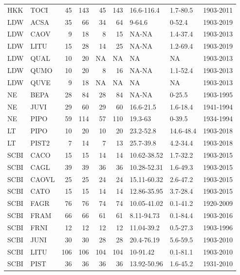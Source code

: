 \documentclass[
]{article}
\begin{document}
\begin{table}[!h]
{\begin{tabular}{llrrrrlll}
\addlinespace
HKK & TOCI & 45 & 143 & 45 & 143 & 16.6-116.4 & 1.7-80.5 & 1903-2011\\
\addlinespace
LDW & ACSA & 35 & 66 & 34 & 64 & 9-64.6 & 0-52.4 & 1903-2019\\
\addlinespace
LDW & CAOV & 9 & 18 & 8 & 15 & NA-NA & 1.4-37.4 & 1903-2013\\
\addlinespace
LDW & LITU & 15 & 28 & 14 & 25 & NA-NA & 1.2-69.4 & 1903-2019\\
\addlinespace
LDW & QUAL & 10 & 20 & NA & NA & NA & NA & 1903-2013\\
\addlinespace
LDW & QUMO & 10 & 20 & 8 & 16 & NA-NA & 1.1-52.4 & 1903-2013\\
\addlinespace
LDW & QUVE & 9 & 18 & NA & NA & NA & NA & 1903-2013\\
\addlinespace
NE & BEPA & 28 & 84 & 28 & 84 & NA-NA & 0-25.5 & 1903-1995\\
\addlinespace
NE & JUVI & 29 & 60 & 29 & 60 & 16.6-21.5 & 1.6-18.4 & 1941-1994\\
\addlinespace
NE & PIPO & 59 & 114 & 57 & 110 & 19.3-63 & 0-39.5 & 1934-1994\\
\addlinespace
LT & PIPO & 10 & 20 & 10 & 20 & 23.2-52.8 & 14.6-48.4 & 1903-2018\\
\addlinespace
LT & PIST2 & 7 & 14 & 7 & 13 & 25.7-39.8 & 4.2-34.4 & 1903-2018\\
\addlinespace
SCBI & CACO & 15 & 15 & 14 & 14 & 10.62-38.52 & 1.7-32.2 & 1903-2015\\
\addlinespace
SCBI & CAGL & 39 & 39 & 36 & 36 & 10.28-52.31 & 1.6-49.3 & 1903-2015\\
\addlinespace
SCBI & CAOVL & 25 & 25 & 24 & 24 & 15.11-60.32 & 2.6-47.2 & 1903-2015\\
\addlinespace
SCBI & CATO & 15 & 15 & 14 & 14 & 12.86-35.95 & 3.7-28.4 & 1903-2015\\
\addlinespace
SCBI & FAGR & 76 & 76 & 74 & 74 & 10.05-41.02 & 0.1-41.2 & 1920-2009\\
\addlinespace
SCBI & FRAM & 66 & 66 & 61 & 61 & 8.11-94.73 & 0.1-84.4 & 1903-2016\\
\addlinespace
SCBI & FRNI & 12 & 12 & 12 & 12 & 11.04-39.2 & 0.5-27.3 & 1903-1996\\
\addlinespace
SCBI & JUNI & 30 & 30 & 28 & 28 & 20.4-76.19 & 5.6-59.5 & 1903-2010\\
\addlinespace
SCBI & LITU & 106 & 106 & 104 & 104 & 10-91.42 & 0.1-81.1 & 1903-2010\\
\addlinespace
SCBI & PIST & 36 & 36 & 36 & 36 & 13.92-50.96 & 1.6-45.2 & 1931-2010\\

\end{tabular}}
\end{table}
\end{document}
